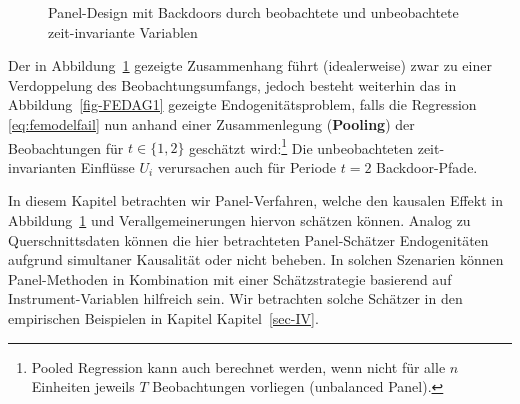 \documentclass[
  a4paper,
  DIV=11,
  oneside]{scrreprt}
\begin{document}
\begin{figure}[t]


\caption{\label{fig-FEDAG2}Panel-Design mit Backdoors durch beobachtete
und unbeobachtete zeit-invariante Variablen}

\end{figure}%

Der in Abbildung~\ref{fig-FEDAG2} gezeigte Zusammenhang führt
(idealerweise) zwar zu einer Verdoppelung des Beobachtungsumfangs,
jedoch besteht weiterhin das in Abbildung~\ref{fig-FEDAG1} gezeigte
Endogenitätsproblem, falls die Regression \eqref{eq:femodelfail} nun
anhand einer Zusammenlegung (\textbf{Pooling}) der Beobachtungen für
\(t\in\{1,2\}\) geschätzt wird:\footnote{Pooled Regression kann auch
  berechnet werden, wenn nicht für alle \(n\) Einheiten jeweils \(T\)
  Beobachtungen vorliegen (unbalanced Panel).} Die unbeobachteten
zeit-invarianten Einflüsse \(U_i\) verursachen auch für Periode \(t=2\)
Backdoor-Pfade.

In diesem Kapitel betrachten wir Panel-Verfahren, welche den kausalen
Effekt in Abbildung~\ref{fig-FEDAG2} und Verallgemeinerungen hiervon
schätzen können. Analog zu Querschnittsdaten können die hier
betrachteten Panel-Schätzer Endogenitäten aufgrund simultaner Kausalität
oder nicht beheben. In solchen Szenarien können Panel-Methoden in
Kombination mit einer Schätzstrategie basierend auf Instrument-Variablen
hilfreich sein. Wir betrachten solche Schätzer in den empirischen
Beispielen in Kapitel Kapitel~\ref{sec-IV}.
\end{document}
